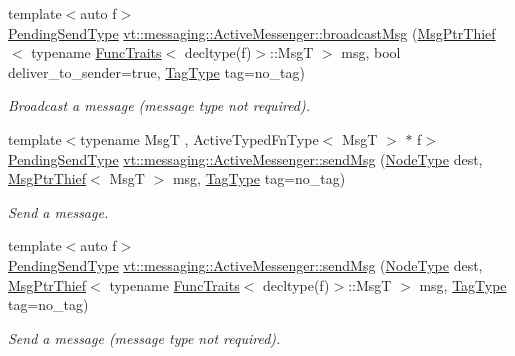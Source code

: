\begin{DoxyCompactItemize}
{\footnotesize template$<$auto f$>$ }\\\hyperlink{structvt_1_1messaging_1_1_active_messenger_a3626a6ca76d8ad4ec7c3b47a2c70d3a8}{Pending\+Send\+Type} \hyperlink{group__typesafehan_gae1504d8a205fc51f9771f6e76271905d}{vt\+::messaging\+::\+Active\+Messenger\+::broadcast\+Msg} (\hyperlink{structvt_1_1messaging_1_1_msg_ptr_thief}{Msg\+Ptr\+Thief}$<$ typename \hyperlink{structvt_1_1_func_traits}{Func\+Traits}$<$ decltype(f)$>$\+::MsgT $>$ msg, bool deliver\+\_\+to\+\_\+sender=true, \hyperlink{namespacevt_a84ab281dae04a52a4b243d6bf62d0e52}{Tag\+Type} tag=no\+\_\+tag)
\begin{DoxyCompactList}\small\item\em Broadcast a message (message type not required). \end{DoxyCompactList}\item 
{\footnotesize template$<$typename MsgT , Active\+Typed\+Fn\+Type$<$ Msg\+T $>$ $\ast$ f$>$ }\\\hyperlink{structvt_1_1messaging_1_1_active_messenger_a3626a6ca76d8ad4ec7c3b47a2c70d3a8}{Pending\+Send\+Type} \hyperlink{group__typesafehan_ga29a784965d1a87bc4abc44f225f40e79}{vt\+::messaging\+::\+Active\+Messenger\+::send\+Msg} (\hyperlink{namespacevt_a866da9d0efc19c0a1ce79e9e492f47e2}{Node\+Type} dest, \hyperlink{structvt_1_1messaging_1_1_msg_ptr_thief}{Msg\+Ptr\+Thief}$<$ MsgT $>$ msg, \hyperlink{namespacevt_a84ab281dae04a52a4b243d6bf62d0e52}{Tag\+Type} tag=no\+\_\+tag)
\begin{DoxyCompactList}\small\item\em Send a message. \end{DoxyCompactList}\item 
{\footnotesize template$<$auto f$>$ }\\\hyperlink{structvt_1_1messaging_1_1_active_messenger_a3626a6ca76d8ad4ec7c3b47a2c70d3a8}{Pending\+Send\+Type} \hyperlink{group__typesafehan_ga3302f205ea51bff679d76cb059dbdce7}{vt\+::messaging\+::\+Active\+Messenger\+::send\+Msg} (\hyperlink{namespacevt_a866da9d0efc19c0a1ce79e9e492f47e2}{Node\+Type} dest, \hyperlink{structvt_1_1messaging_1_1_msg_ptr_thief}{Msg\+Ptr\+Thief}$<$ typename \hyperlink{structvt_1_1_func_traits}{Func\+Traits}$<$ decltype(f)$>$\+::MsgT $>$ msg, \hyperlink{namespacevt_a84ab281dae04a52a4b243d6bf62d0e52}{Tag\+Type} tag=no\+\_\+tag)
\begin{DoxyCompactList}\small\item\em Send a message (message type not required). \end{DoxyCompactList}\item 

\end{DoxyCompactItemize}
